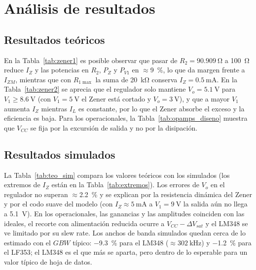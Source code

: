 \documentclass[9pt, conference]{IEEEtran}
\newcommand{\qV}[1]{\SI{#1}{\volt}}
\newcommand{\qmA}[1]{\SI{#1}{\milli\ampere}}
\newcommand{\qohm}[1]{\SI{#1}{\ohm}}
\newcommand{\qkohm}[1]{\SI{#1}{\kilo\ohm}}
\newcommand{\pct}[1]{\SI{#1}{\percent}}
\begin{document}
\section{Análisis de resultados}
\subsection{Resultados teóricos}
En la Tabla~\ref{tab:zener1} es posible observar que pasar de $R_2=\qohm{90.909}$ a \qohm{100} reduce $I_Z$ y las potencias en $R_2$, $P_Z$ y $P_{V1}$ en $\approx$\pct{9}, lo que da margen frente a $I_{ZM}$, mientras que con $R_{1\max}$ la suma de \qkohm{20} conserva $I_Z=\qmA{0.5}$. En la Tabla~\ref{tab:zener2} se aprecia que el regulador solo mantiene $V_o=\qV{5.1}$ para $V_1\ge\qV{8.6}$ (con $V_1=\qV{5}$ el Zener está cortado y $V_o=\qV{3}$), y que a mayor $V_1$ aumenta $I_Z$ mientras $I_L$ es constante, por lo que el Zener absorbe el exceso y la eficiencia es baja. Para los operacionales, la Tabla~\ref{tab:opamps_diseno} muestra que $V_{CC}$ se fija por la excursión de salida y no por la disipación.

\subsection{Resultados simulados}
La Tabla~\ref{tab:teo_sim} compara los valores teóricos con los simulados (los extremos de $I_Z$ están en la Tabla~\ref{tab:extremos}). Los errores de $V_o$ en el regulador no superan $\approx$\pct{2.2} y se explican por la resistencia dinámica del Zener y por el codo suave del modelo (con $I_Z\approx\qmA{5}$ a $V_1=\qV{9}$ la salida aún no llega a \qV{5.1}). En los operacionales, las ganancias y las amplitudes coinciden con las ideales, el recorte con alimentación reducida ocurre a $V_{CC}-\Delta V_{sat}$ y el LM348 se ve limitado por su slew rate. Los anchos de banda simulados quedan cerca de lo estimado con el $GBW$ típico: \pct{-9.3} para el LM348 ($\approx\SI{302}{\kilo\hertz}$) y \pct{-1.2} para el LF353; el LM348 es el que más se aparta, pero dentro de lo esperable para un valor típico de hoja de datos.
\end{document}
